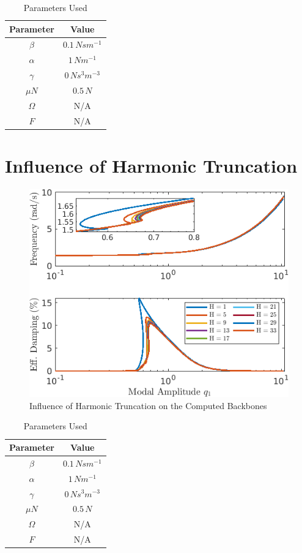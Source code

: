 \documentclass[12pt]{article}
\begin{document}
\begin{table}[!h]
  \centering
  \caption{Parameters Used}
  \begin{tabular}[t]{c|c}
    \hline\hline
    \textbf{Parameter} & \textbf{Value}\\\hline
    $\beta$ & $0.1\,Ns m^{-1}$\\
    $\alpha$ & $1\, N m^{-1}$\\
    $\gamma$ & $0\, Ns^3 m^{-3}$\\
    $\mu N$ & $0.5\, N$\\
    $\Omega$ & N/A\\
    $F$ & N/A\\
    \hline\hline
  \end{tabular}
\end{table}

\pagebreak
\section{Influence of Harmonic Truncation}
\label{sec:influence-hamronics}

\begin{figure}[!h]
  \centering
  \includegraphics[width=0.6\linewidth]{FIGS/D_EPMCBBHCOMP}
  \caption{Influence of Harmonic Truncation on the Computed Backbones}
\end{figure}

\begin{table}[!h]
  \centering
  \caption{Parameters Used}
  \begin{tabular}[t]{c|c}
    \hline\hline
    \textbf{Parameter} & \textbf{Value}\\\hline
    $\beta$ & $0.1\,Ns m^{-1}$\\
    $\alpha$ & $1\, N m^{-1}$\\
    $\gamma$ & $0\, Ns^3 m^{-3}$\\
    $\mu N$ & $0.5\, N$\\
    $\Omega$ & N/A\\
    $F$ & N/A\\
    \hline\hline
  \end{tabular}
\end{table}
\end{document}
